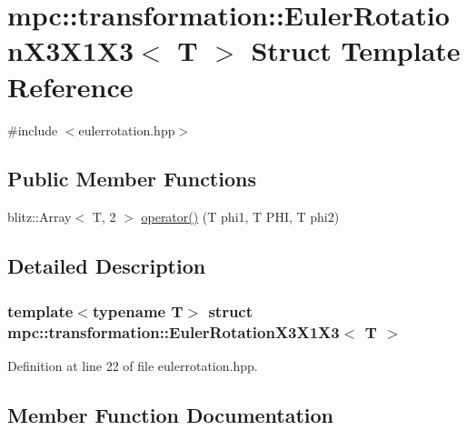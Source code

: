 \hypertarget{structmpc_1_1transformation_1_1_euler_rotation_x3_x1_x3}{}\section{mpc\+:\+:transformation\+:\+:Euler\+Rotation\+X3\+X1\+X3$<$ T $>$ Struct Template Reference}
\label{structmpc_1_1transformation_1_1_euler_rotation_x3_x1_x3}


{\ttfamily \#include $<$eulerrotation.\+hpp$>$}

\subsection*{Public Member Functions}
\begin{DoxyCompactItemize}
\item 
blitz\+::\+Array$<$ T, 2 $>$ \mbox{\hyperlink{structmpc_1_1transformation_1_1_euler_rotation_x3_x1_x3_a5a6dda789469ec39d472d4e1458678ec}{operator()}} (T phi1, T P\+HI, T phi2)
\end{DoxyCompactItemize}


\subsection{Detailed Description}
\subsubsection*{template$<$typename T$>$\newline
struct mpc\+::transformation\+::\+Euler\+Rotation\+X3\+X1\+X3$<$ T $>$}



Definition at line 22 of file eulerrotation.\+hpp.



\subsection{Member Function Documentation}
\mbox{\label{structmpc_1_1transformation_1_1_euler_rotation_x3_x1_x3_a5a6dda789469ec39d472d4e1458678ec}} 
